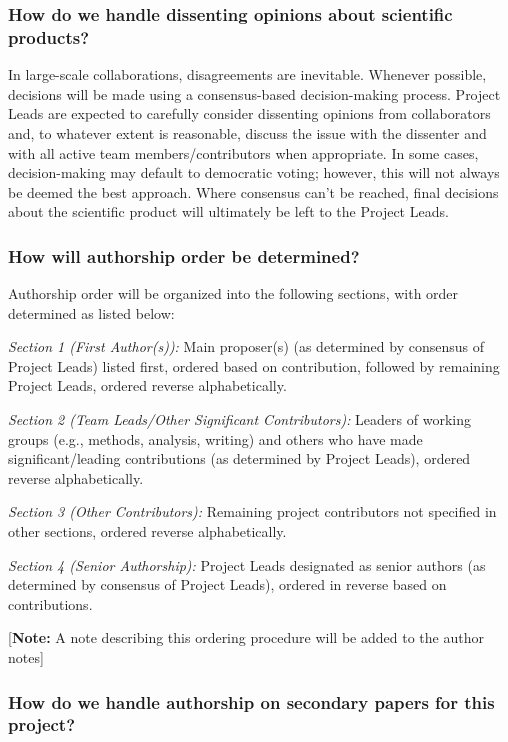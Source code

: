 \documentclass[
  letterpaper,
  DIV=11,
  numbers=noendperiod,
  oneside]{scrreprt}
\begin{document}
\subsubsection{How do we handle dissenting opinions about scientific
products?}\label{how-do-we-handle-dissenting-opinions-about-scientific-products}

In large-scale collaborations, disagreements are inevitable. Whenever
possible, decisions will be made using a consensus-based decision-making
process. Project Leads are expected to carefully consider dissenting
opinions from collaborators and, to whatever extent is reasonable,
discuss the issue with the dissenter and with all active team
members/contributors when appropriate. In some cases, decision-making
may default to democratic voting; however, this will not always be
deemed the best approach. Where consensus can't be reached, final
decisions about the scientific product will ultimately be left to the
Project Leads.

\subsubsection{How will authorship order be
determined?}\label{how-will-authorship-order-be-determined}

Authorship order will be organized into the following sections, with
order determined as listed below:

\emph{Section 1 (First Author(s)):} Main proposer(s) (as determined by
consensus of Project Leads) listed first, ordered based on contribution,
followed by remaining Project Leads, ordered reverse alphabetically.

\emph{Section 2 (Team Leads/Other Significant Contributors):} Leaders of
working groups (e.g., methods, analysis, writing) and others who have
made significant/leading contributions (as determined by Project Leads),
ordered reverse alphabetically.

\emph{Section 3 (Other Contributors):} Remaining project contributors
not specified in other sections, ordered reverse alphabetically.

\emph{Section 4 (Senior Authorship):} Project Leads designated as senior
authors (as determined by consensus of Project Leads), ordered in
reverse based on contributions.

{[}\textbf{Note:} A note describing this ordering procedure will be
added to the author notes{]}

\subsubsection{How do we handle authorship on secondary papers for this
project?}\label{how-do-we-handle-authorship-on-secondary-papers-for-this-project}
\end{document}

